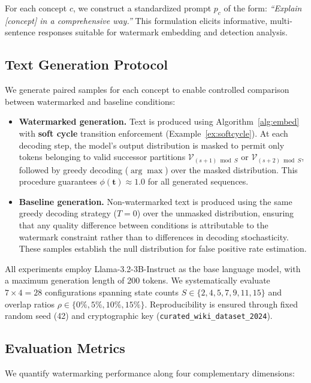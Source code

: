 \documentclass[11pt]{article}
\theoremstyle{definition}
\theoremstyle{remark}
\begin{document}
For each concept $c$, we construct a standardized prompt $p_c$ of the form: \textit{``Explain [concept] in a comprehensive way.''} This formulation elicits informative, multi-sentence responses suitable for watermark embedding and detection analysis.

\subsection{Text Generation Protocol}

We generate paired samples for each concept to enable controlled comparison between watermarked and baseline conditions:

\begin{itemize}
    \item \textbf{Watermarked generation.} Text is produced using Algorithm~\ref{alg:embed} with \textbf{soft cycle} transition enforcement (Example~\ref{ex:softcycle}). At each decoding step, the model's output distribution is masked to permit only tokens belonging to valid successor partitions $\mathcal{V}_{(s+1) \bmod S}$ or $\mathcal{V}_{(s+2) \bmod S}$, followed by greedy decoding ($\arg\max$) over the masked distribution. This procedure guarantees $\phi(\mathbf{t}) \approx 1.0$ for all generated sequences.

    \item \textbf{Baseline generation.} Non-watermarked text is produced using the same greedy decoding strategy ($T = 0$) over the unmasked distribution, ensuring that any quality difference between conditions is attributable to the watermark constraint rather than to differences in decoding stochasticity. These samples establish the null distribution for false positive rate estimation.
\end{itemize}

All experiments employ Llama-3.2-3B-Instruct as the base language model, with a maximum generation length of 200 tokens. We systematically evaluate $7 \times 4 = 28$ configurations spanning state counts $S \in \{2, 4, 5, 7, 9, 11, 15\}$ and overlap ratios $\rho \in \{0\%, 5\%, 10\%, 15\%\}$. Reproducibility is ensured through fixed random seed (42) and cryptographic key (\texttt{curated\_wiki\_dataset\_2024}).

\subsection{Evaluation Metrics}

We quantify watermarking performance along four complementary dimensions:
\end{document}
